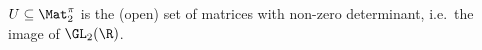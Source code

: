 $U\subseteq\Mat_2^{\pi}$ is the (open) set of matrices with non-zero determinant, i.e.\ the image of $\GL_2(\R)$.
